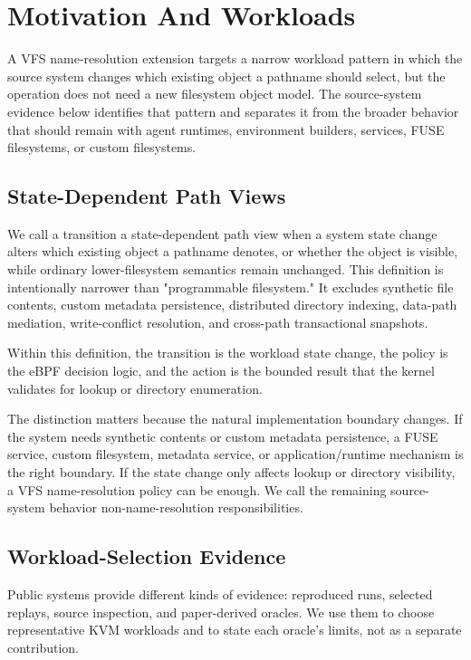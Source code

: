 \section{Motivation And Workloads}
\label{sec:workload-characterization}

A VFS name-resolution extension targets a narrow workload pattern in which the
source system changes which existing object a pathname should select, but the
operation does not need a new filesystem object model.
The source-system evidence below identifies that pattern and separates it from
the broader behavior that should remain with agent runtimes, environment
builders, services, FUSE filesystems, or custom filesystems.

\subsection{State-Dependent Path Views}

We call a transition a state-dependent path view when a system state change
alters which existing object a pathname denotes, or whether the object is
visible, while ordinary lower-filesystem semantics remain unchanged. This
definition is intentionally narrower than "programmable filesystem." It
excludes synthetic file contents, custom metadata persistence, distributed
directory indexing, data-path mediation, write-conflict resolution, and
cross-path transactional snapshots.

Within this definition, the transition is the workload state change, the policy
is the eBPF decision logic, and the action is the bounded result that the kernel
validates for lookup or directory enumeration.

The distinction matters because the natural implementation boundary changes.
If the system needs synthetic contents or custom metadata persistence, a FUSE
service, custom filesystem, metadata service, or application/runtime mechanism
is the right boundary. If the state change only affects lookup or directory
visibility, a VFS name-resolution policy can be enough. We call the remaining
source-system behavior non-name-resolution responsibilities.

\subsection{Workload-Selection Evidence}

Public systems provide different kinds of evidence: reproduced runs, selected
replays, source inspection, and paper-derived oracles. We use them to choose
representative KVM workloads and to state each oracle's limits, not as a
separate contribution.

